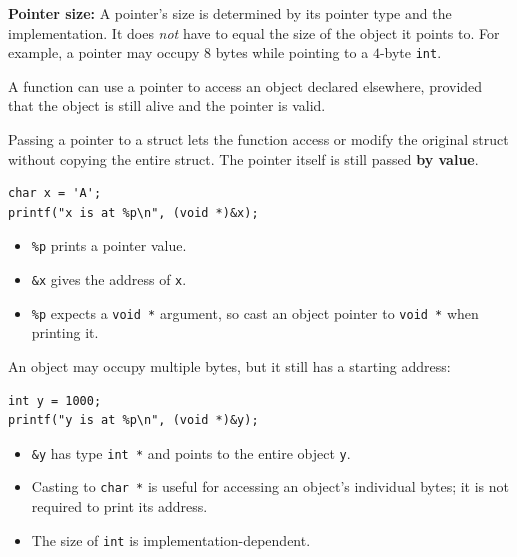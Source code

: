 \documentclass[11pt,a4paper]{article}
\begin{document}
\textbf{Pointer size:}
A pointer's size is determined by its pointer type and the
implementation. It does \emph{not} have to equal the size of the
object it points to. For example, a pointer may occupy \(8\) bytes
while pointing to a \(4\)-byte \texttt{int}.


A function can use a pointer to access an object declared elsewhere,
provided that the object is still alive and the pointer is valid.

Passing a pointer to a struct lets the function access or modify the
original struct without copying the entire struct. The pointer
itself is still passed \textbf{by value}.



\begin{lstlisting}[style=cscode]
char x = 'A';
printf("x is at %p\n", (void *)&x);
\end{lstlisting}

\begin{itemize}
    \item \texttt{\%p} prints a pointer value.
    \item \texttt{\&x} gives the address of \texttt{x}.
    \item \texttt{\%p} expects a \texttt{void *} argument, so cast
          an object pointer to \texttt{void *} when printing it.
\end{itemize}

An object may occupy multiple bytes, but it still has a starting
address:
\begin{lstlisting}[style=cscode]
int y = 1000;
printf("y is at %p\n", (void *)&y);
\end{lstlisting}

\begin{itemize}
    \item \texttt{\&y} has type \texttt{int *} and points to the
          entire object \texttt{y}.
    \item Casting to \texttt{char *} is useful for accessing an
          object's individual bytes; it is not required to print
          its address.
    \item The size of \texttt{int} is implementation-dependent.
\end{itemize}
\end{document}

